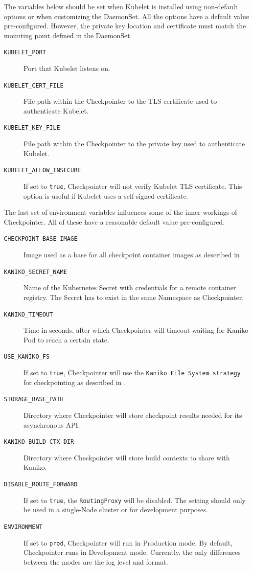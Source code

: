 \documentclass[
  digital,     %
  oneside,     %
  nosansbold,  %
  nocolorbold, %
  lof,         %
  nolot,         %
]{fithesis4}
\begin{document}
The variables below should be set when Kubelet is installed using non-default options or when customizing the DaemonSet. All the options have a default value pre-configured. However, the private key location and certificate must match the mounting point defined in the DaemonSet.
\begin{description}
    \item[\texttt{KUBELET\_PORT}] Port that Kubelet listens on.
    \item[\texttt{KUBELET\_CERT\_FILE}] File path within the Checkpointer to the TLS certificate used to authenticate Kubelet.
    \item[\texttt{KUBELET\_KEY\_FILE}] File path within the Checkpointer to the private key used to authenticate Kubelet.
    \item[\texttt{KUBELET\_ALLOW\_INSECURE}] If set to \texttt{true}, Checkpointer will not verify Kubelet TLS certificate. This option is useful if Kubelet uses a self-signed certificate.
\end{description}

The last set of environment variables influences some of the inner workings of Checkpointer. All of these have a reasonable default value pre-configured.
\begin{description}
    \item[\texttt{CHECKPOINT\_BASE\_IMAGE}] Image used as a base for all checkpoint container images as described in .
    \item[\texttt{KANIKO\_SECRET\_NAME}] Name of the Kubernetes Secret with credentials for a remote container registry. The Secret has to exist in the same Namespace as Checkpointer.
    \item[\texttt{KANIKO\_TIMEOUT}] Time in seconds, after which Checkpointer will timeout waiting for Kaniko Pod to reach a certain state.
    \item[\texttt{USE\_KANIKO\_FS}] If set to \texttt{true}, Checkpointer will use the \texttt{Kaniko File System strategy} for checkpointing as described in .
    \item[\texttt{STORAGE\_BASE\_PATH}] Directory where Checkpointer will store checkpoint results needed for its asynchronous API.
    \item[\texttt{KANIKO\_BUILD\_CTX\_DIR}] Directory where Checkpointer will store build contexts to share with Kaniko.
    \item[\texttt{DISABLE\_ROUTE\_FORWARD}] If set to \texttt{true}, the \texttt{RoutingProxy} will be disabled. The setting should only be used in a single-Node cluster or for development purposes.
     \item[\texttt{ENVIRONMENT}] If set to \texttt{prod}, Checkpointer will run in Production mode. By default, Checkpointer runs in Development mode. Currently, the only differences between the modes are the log level and format.
\end{description}
\end{document}
